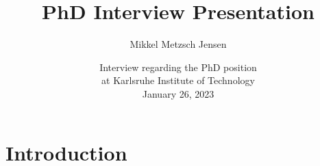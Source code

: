 \documentclass[
	10pt, %
]{beamer}
\title[PhD Interview Presentation]{PhD Interview Presentation} %
\author[Mikkel Metzsch Jensen]{Mikkel Metzsch Jensen} %
\institute[UiO]{University of Oslo} %
\date[\today]{Interview regarding the PhD position \\ at Karlsruhe Institute of Technology \\ January 26, 2023} %
\begin{document}

\begin{frame}
	\titlepage %
\end{frame}



	



\section{Introduction}
\end{document}

